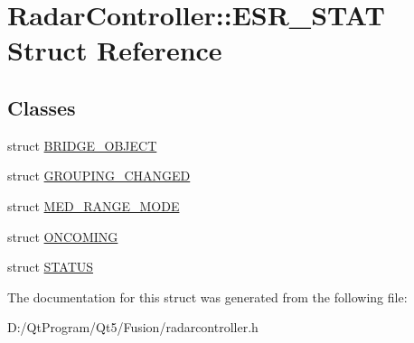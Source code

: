 \hypertarget{struct_radar_controller_1_1_e_s_r___s_t_a_t}{}\section{Radar\+Controller\+:\+:E\+S\+R\+\_\+\+S\+T\+A\+T Struct Reference}
\label{struct_radar_controller_1_1_e_s_r___s_t_a_t}
\subsection*{Classes}
\begin{DoxyCompactItemize}
\item 
struct \hyperlink{struct_radar_controller_1_1_e_s_r___s_t_a_t_1_1_b_r_i_d_g_e___o_b_j_e_c_t}{B\+R\+I\+D\+G\+E\+\_\+\+O\+B\+J\+E\+C\+T}
\item 
struct \hyperlink{struct_radar_controller_1_1_e_s_r___s_t_a_t_1_1_g_r_o_u_p_i_n_g___c_h_a_n_g_e_d}{G\+R\+O\+U\+P\+I\+N\+G\+\_\+\+C\+H\+A\+N\+G\+E\+D}
\item 
struct \hyperlink{struct_radar_controller_1_1_e_s_r___s_t_a_t_1_1_m_e_d___r_a_n_g_e___m_o_d_e}{M\+E\+D\+\_\+\+R\+A\+N\+G\+E\+\_\+\+M\+O\+D\+E}
\item 
struct \hyperlink{struct_radar_controller_1_1_e_s_r___s_t_a_t_1_1_o_n_c_o_m_i_n_g}{O\+N\+C\+O\+M\+I\+N\+G}
\item 
struct \hyperlink{struct_radar_controller_1_1_e_s_r___s_t_a_t_1_1_s_t_a_t_u_s}{S\+T\+A\+T\+U\+S}
\end{DoxyCompactItemize}


The documentation for this struct was generated from the following file\+:\begin{DoxyCompactItemize}
\item 
D\+:/\+Qt\+Program/\+Qt5/\+Fusion/radarcontroller.\+h\end{DoxyCompactItemize}
